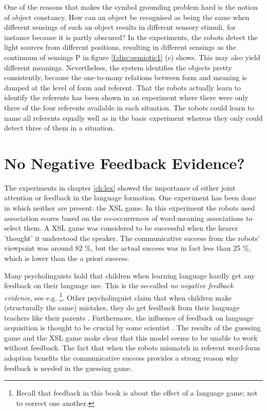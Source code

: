 One of the reasons that makes the symbol grounding problem hard is the notion of object constancy. How can an object be recognised as being the same when different sensings of such an object results in different sensory stimuli, for instance because it is partly obscured? In the experiments, the robots detect the light sources from different positions, resulting in different sensings as the continuum of sensings P in figure \ref{f:disc:semiotic1} (c) shows. This may also yield different meanings. Nevertheless, the system identifies the objects pretty consistently, because the one-to-many relations between form and meaning is damped at the level of form and referent. That the robots actually learn to identify the referents has been shown in an experiment where there were only three of the four referents available in each situation. The robots could learn to name all referents equally well as in the basic experiment whereas they only could detect three of them in a situation.



\section{No Negative Feedback Evidence?}\label{s:disc:feed}

The experiments in chapter \ref{ch:lex} showed the importance of either joint attention or feedback in the language formation. One experiment has been done in which neither are present: the XSL game. In this experiment the robots used association scores based on the co-occurrences of word-meaning associations to select them. A XSL game was considered to be successful when the hearer 'thought' it understood the speaker. The communicative success from the robots' viewpoint was around 82 \%, but the actual success was in fact less than 25 \%, which is lower than the a priori success. 


Many psycholinguists hold that children when learning language hardly get any feedback on their language use. This is the so-called {\em no negative feedback evidence}, see e.g. \citep{braine:1971,bowerman:1988}\footnote{Recall that feedback in this book is about the effect of a language game; not to correct one another.}. Other psycholinguist claim that when children make (structurally the same) mistakes, they do get feedback from their language teachers like their parents \citep{demetrasetal:1986}. Furthermore, the influence of feedback on language acquisition is thought to be crucial by some scientist \citep{clancey:1997,demetrasetal:1986,clarkclark:1977,tomasellobarton:1994}. The results of the guessing game and the XSL game make clear that this model seems to be unable to work without feedback. The fact that when the robots mismatch in referent word-form adoption benefits the communicative success provides a strong reason why feedback is needed in the guessing game. 

